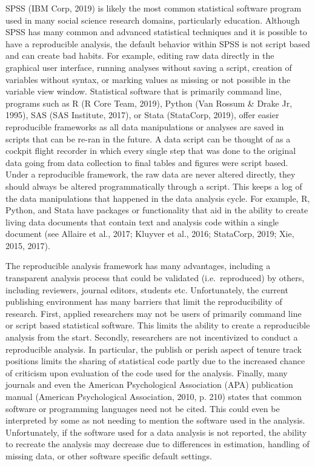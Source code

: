 \documentclass[
  english,
  ,man]{apa6}
\begin{document}
SPSS (IBM Corp, 2019) is likely the most common statistical software program used in many social science research domains, particularly education. Although SPSS has many common and advanced statistical techniques and it is possible to have a reproducible analysis, the default behavior within SPSS is not script based and can create bad habits. For example, editing raw data directly in the graphical user interface, running analyses without saving a script, creation of variables without syntax, or marking values as missing or not possible in the variable view window. Statistical software that is primarily command line, programs such as R (R Core Team, 2019), Python (Van Rossum \& Drake Jr, 1995), SAS (SAS Institute, 2017), or Stata (StataCorp, 2019), offer easier reproducible frameworks as all data manipulations or analyses are saved in scripts that can be re-ran in the future. A data script can be thought of as a cockpit flight recorder in which every single step that was done to the original data going from data collection to final tables and figures were script based. Under a reproducible framework, the raw data are never altered directly, they should always be altered programmatically through a script. This keeps a log of the data manipulations that happened in the data analysis cycle. For example, R, Python, and Stata have packages or functionality that aid in the ability to create living data documents that contain text and analysis code within a single document (see Allaire et al., 2017; Kluyver et al., 2016; StataCorp, 2019; Xie, 2015, 2017).

The reproducible analysis framework has many advantages, including a transparent analysis process that could be validated (i.e.~reproduced) by others, including reviewers, journal editors, students etc. Unfortunately, the current publishing environment has many barriers that limit the reproducibility of research. First, applied researchers may not be users of primarily command line or script based statistical software. This limits the ability to create a reproducible analysis from the start. Secondly, researchers are not incentivized to conduct a reproducible analysis. In particular, the publish or perish aspect of tenure track positions limits the sharing of statistical code partly due to the increased chance of criticism upon evaluation of the code used for the analysis. Finally, many journals and even the American Psychological Association (APA) publication manual (American Psychological Association, 2010, p. 210) states that common software or programming languages need not be cited. This could even be interpreted by some as not needing to mention the software used in the analysis. Unfortunately, if the software used for a data analysis is not reported, the ability to recreate the analysis may decrease due to differences in estimation, handling of missing data, or other software specific default settings.
\end{document}
